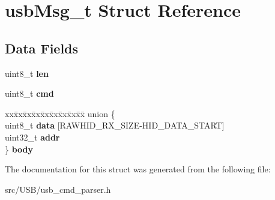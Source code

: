 \hypertarget{structusb_msg__t}{}\section{usb\+Msg\+\_\+t Struct Reference}
\label{structusb_msg__t}
\subsection*{Data Fields}
\begin{DoxyCompactItemize}
\item 
uint8\+\_\+t {\bfseries len}\hypertarget{structusb_msg__t_a5723e60ffd628510c699eddbce90be23}{}\label{structusb_msg__t_a5723e60ffd628510c699eddbce90be23}

\item 
uint8\+\_\+t {\bfseries cmd}\hypertarget{structusb_msg__t_a4d43e8212bdc9dbee866506f04effcea}{}\label{structusb_msg__t_a4d43e8212bdc9dbee866506f04effcea}

\item 
\begin{tabbing}
xx\=xx\=xx\=xx\=xx\=xx\=xx\=xx\=xx\=\kill
union \{\\
\>uint8\_t {\bfseries data} \mbox{[}RAWHID\_RX\_SIZE-\/HID\_DATA\_START\mbox{]}\\
\>uint32\_t {\bfseries addr}\\
\} {\bfseries body}\hypertarget{structusb_msg__t_afca694c280a7b8d53d30f99f313a7bbb}{}\label{structusb_msg__t_afca694c280a7b8d53d30f99f313a7bbb}
\\

\end{tabbing}\end{DoxyCompactItemize}


The documentation for this struct was generated from the following file\+:\begin{DoxyCompactItemize}
\item 
src/\+U\+S\+B/usb\+\_\+cmd\+\_\+parser.\+h\end{DoxyCompactItemize}
